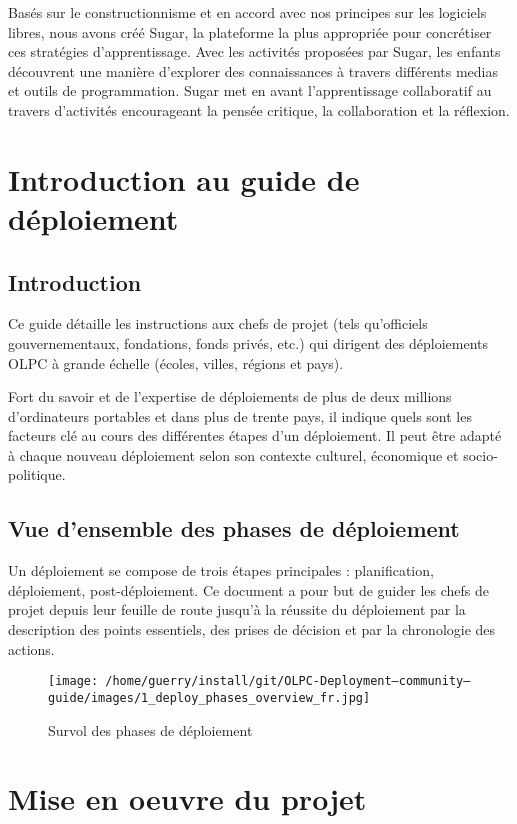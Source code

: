 \documentclass[11pt]{article}
\begin{document}


Basés sur le constructionnisme et en accord avec nos principes sur les
logiciels libres, nous avons créé Sugar, la plateforme la plus appropriée
pour concrétiser ces stratégies d'apprentissage. Avec les activités
proposées par Sugar, les enfants découvrent une manière d'explorer des
connaissances à travers différents medias et outils de programmation. Sugar
met en avant l'apprentissage collaboratif au travers d'activités
encourageant la pensée critique, la collaboration et la réflexion.
\section{Introduction au guide de déploiement}
\label{sec-3}
\subsection{Introduction}
\label{sec-3-1}


Ce guide détaille les instructions aux chefs de projet (tels qu'officiels
gouvernementaux, fondations, fonds privés, etc.) qui dirigent des
déploiements OLPC à grande échelle (écoles, villes, régions et pays).

Fort du savoir et de l'expertise de déploiements de plus de deux millions
d'ordinateurs portables et dans plus de trente pays, il indique quels sont
les facteurs clé au cours des différentes étapes d'un déploiement. Il peut
être adapté à chaque nouveau déploiement selon son contexte culturel,
économique et socio-politique.
\subsection{Vue d'ensemble des phases de déploiement}
\label{sec-3-2}


Un déploiement se compose de trois étapes principales : planification,
déploiement, post-déploiement. Ce document a pour but de guider les chefs
de projet depuis leur feuille de route jusqu'à la réussite du déploiement
par la description des points essentiels, des prises de décision et par la
chronologie des actions.

\begin{figure}[htb]
\centering
\texttt{[image: /home/guerry/install/git/OLPC-Deployment--community--guide/images/1\_deploy\_phases\_overview\_fr.jpg]}
\caption{Survol des phases de déploiement}
\end{figure}
\section{Mise en oeuvre du projet}
\label{sec-4}
\end{document}
